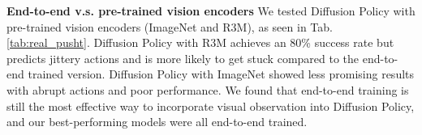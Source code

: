 \documentclass[Afour,sageh,times]{sagej}
\begin{document}
\textbf{End-to-end v.s. pre-trained vision encoders}
We tested Diffusion Policy with pre-trained vision encoders (ImageNet \cite{deng2009imagenet} and R3M\cite{nair2022r3m}), as seen in Tab. \ref{tab:real_pusht}. Diffusion Policy with R3M achieves an 80\% success rate but predicts jittery actions and is more likely to get stuck compared to the end-to-end trained version. Diffusion Policy with ImageNet showed less promising results with abrupt actions and poor performance. We found that end-to-end training is still the most effective way to incorporate visual observation into Diffusion Policy, and our best-performing models were all end-to-end trained.


\end{document}
